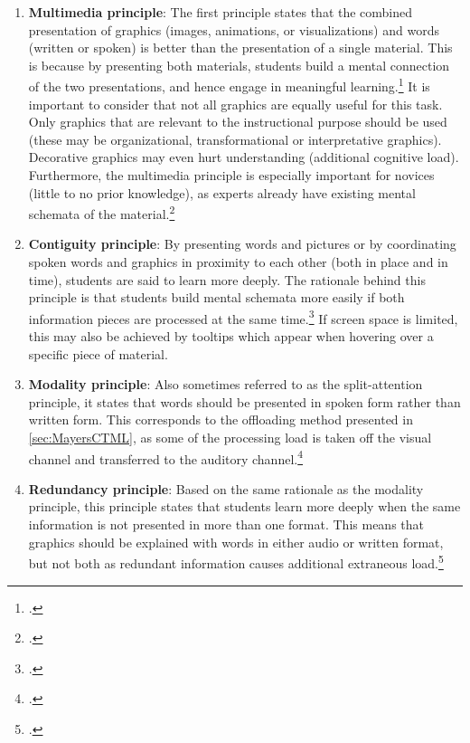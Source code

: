 \begin{enumerate}
    \item \textbf{Multimedia principle}: The first principle states that the combined presentation of graphics (images, animations, or visualizations) and words (written or spoken) is better than the presentation of a single material. This is because by presenting both materials, students build a mental connection of the two presentations, and hence engage in meaningful learning.\footcites[Cf.][p.19]{MayerAnimationAidMultimedia2001}[cf.][chapter 4, paragraph 7]{ClarkElearningscienceinstruction2016}[cf.][p.13]{MayerCognitiveTheoryMultimedia1999} It is important to consider that not all graphics are equally useful for this task. Only graphics that are relevant to the instructional purpose should be used (these may be organizational, transformational or interpretative graphics). Decorative graphics may even hurt understanding (additional cognitive load). Furthermore, the multimedia principle is especially important for novices (little to no prior knowledge), as experts already have existing mental schemata of the material.\footcites[Cf.][chapter 4, paragraphs 7 et seq]{ClarkElearningscienceinstruction2016}[cf. in addition][]{MayerWhenillustrationworth1990}
    \item \textbf{Contiguity principle}: By presenting words and pictures or by coordinating spoken words and graphics in proximity to each other (both in place and in time), students are said to learn more deeply. The rationale behind this principle is that students build mental schemata more easily if both information pieces are processed at the same time.\footcites[Cf.][p. 19 et seqq]{MayerAnimationAidMultimedia2001}[cf.][chapter 5, paragraphs 1 et seq]{ClarkElearningscienceinstruction2016} If screen space is limited, this may also be achieved by tooltips which appear when hovering over a specific piece of material.
    \item \textbf{Modality principle}: Also sometimes referred to as the split-attention principle, it states that words should be presented in spoken form rather than written form. This corresponds to the offloading method presented in \ref{sec:MayersCTML}, as some of the processing load is taken off the visual channel and transferred to the auditory channel.\footcites[Cf.][p.22]{MayerAnimationAidMultimedia2001}[cf.][p.14]{MayerCognitiveTheoryMultimedia1999}
    \item \textbf{Redundancy principle}: Based on the same rationale as the modality principle, this principle states that students learn more deeply when the same information is not presented in more than one format. This means that graphics should be explained with words in either audio or written format, but not both as redundant information causes additional extraneous load.\footcites[Cf.][chapters 6 and 7]{ClarkElearningscienceinstruction2016}[cf.][p.6]{MayerMultimediaLearning2009}[cf.][p.22]{MayerAnimationAidMultimedia2001}[cf. in addition][]{MayerPrinciplesreducingextraneous2014}

\end{enumerate}
